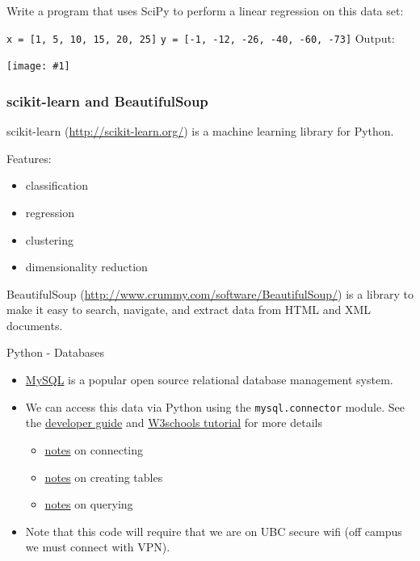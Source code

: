 \documentclass[xcolor=svgnames, handout]{beamer}
\newcommand{\nl}{\\[1em]}
\newcommand{\ipic}[2]{\texttt{[image: \#1]}}
\newcommand{\ft}[1]{\frametitle{#1}}
\begin{document}
\begin{frame}
\begin{example}
 Write a program that uses SciPy to perform a linear regression on this data set:
 
{\tt x = [1, 5, 10, 15, 20, 25]} \newline
{\tt y = [-1, -12, -26, -40, -60, -73]}\newline
Output:
\end{example}
\begin{center}
\ipic{scipy}{0.6}
\end{center}
\end{frame}


\begin{frame}[fragile]\ft{scikit-learn and BeautifulSoup}
scikit-learn (\url{http://scikit-learn.org/}) is a machine learning library for Python.

Features:
\begin{itemize}
\item  classification
\item regression
\item clustering
\item dimensionality reduction

\end{itemize}

BeautifulSoup (\url{http://www.crummy.com/software/BeautifulSoup/}) is a library to make it easy to search, navigate, and extract data from HTML and XML documents.

\end{frame}



\begin{frame}{Python - Databases}
\begin{itemize}
\item \href{https://www.mysql.com/}{MySQL} is a popular open source relational database management system.\nl
\item We can access this data via Python using the {\tt mysql.connector} module. See the  \href{https://dev.mysql.com/doc/connector-python/en/}{developer guide} and \href{https://www.w3schools.com/python/python_mysql_getstarted.asp}{W3schools tutorial} for more details
\begin{itemize}
\item \href{https://dev.mysql.com/doc/connector-python/en/connector-python-example-connecting.html}{notes} on connecting
\item \href{https://dev.mysql.com/doc/connector-python/en/connector-python-example-ddl.html}{notes} on creating tables
\item \href{https://dev.mysql.com/doc/connector-python/en/connector-python-example-cursor-select.html}{notes} on querying\nl
\end{itemize}

\item Note that this code will require that we are on UBC secure wifi (off campus we must connect with VPN).\nl
\end{itemize}
\end{frame}
\end{document}
